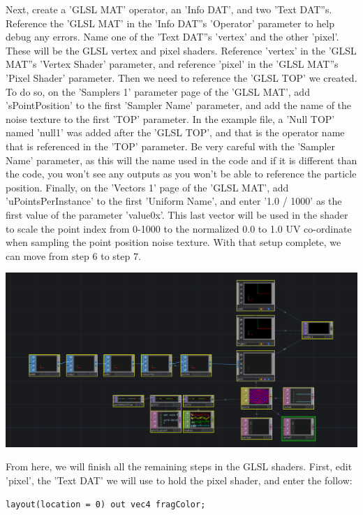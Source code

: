 \begin{fullwidth}
Next, create a 'GLSL MAT' operator, an 'Info DAT', and two 'Text DAT''s. Reference the 'GLSL MAT' in the 'Info DAT''s 'Operator' parameter to help debug any errors. Name one of the 'Text DAT''s 'vertex' and the other 'pixel'. These will be the GLSL vertex and pixel shaders. Reference 'vertex' in the 'GLSL MAT''s 'Vertex Shader' parameter, and reference 'pixel' in the 'GLSL MAT''s 'Pixel Shader' parameter. Then we need to reference the 'GLSL TOP' we created. To do so, on the 'Samplers 1' parameter page of the 'GLSL MAT', add 'sPointPosition' to the first 'Sampler Name' parameter, and add the name of the noise texture to the first 'TOP' parameter. In the example file, a 'Null TOP' named 'null1' was added after the 'GLSL TOP', and that is the operator name that is referenced in the 'TOP' parameter. Be very careful with the 'Sampler Name' parameter, as this will the name used in the code and if it is different than the code, you won't see any outputs as you won't be able to reference the particle position. Finally, on the 'Vectors 1' page of the 'GLSL MAT', add 'uPointsPerInstance' to the first 'Uniform Name', and enter '1.0 / 1000' as the first value of the parameter 'value0x'. This last vector will be used in the shader to scale the point index from 0-1000 to the normalized 0.0 to 1.0 UV co-ordinate when sampling the point position noise texture. With that setup complete, we can move from step 6 to step 7.

\begin{center}
\includegraphics{./img/12.6.2/step6.png}
\end{center}

From here, we will finish all the remaining steps in the GLSL shaders. First, edit 'pixel', the 'Text DAT' we will use to hold the pixel shader, and enter the follow:

\begin{lstlisting}
layout(location = 0) out vec4 fragColor;


\end{lstlisting}
\end{fullwidth}
